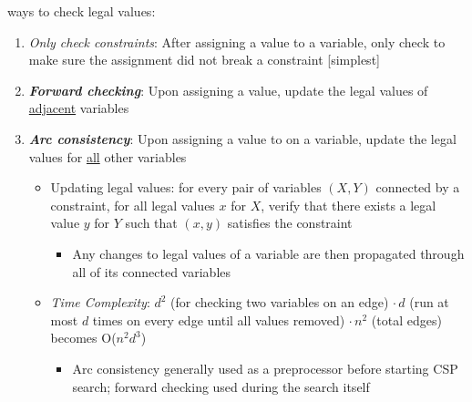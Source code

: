 \documentclass[12pt]{extarticle}
\theoremstyle{definition}
\theoremstyle{remark}
\newcommand{\pstart}[0]{\noindent}
\newcommand{\term}[1]{\noindent\textbf{\textit{#1}}}
\begin{document}
\vspace{4pt}\pstart
3 ways to check legal values: \begin{enumerate}
    \item \textit{Only check constraints}: After assigning a value to a variable, only check to make sure the assignment did not break a constraint [simplest]
    \item \term{Forward checking}: Upon assigning a value, update the legal values of \ul{adjacent} variables
    \item \term{Arc consistency}: Upon assigning a value to on a variable, update the legal values for \ul{all} other variables\begin{itemize}
        \item Updating legal values: for every pair of variables $(X,Y)$ connected by a constraint, for all legal values $x$ for $X$, verify that there exists a legal value $y$ for $Y$ such that $(x,y)$ satisfies the constraint \begin{itemize}
            \item Any changes to legal values of a variable are then propagated through all of its connected variables
        \end{itemize}
        \item \textit{Time Complexity}: $d^2$ (for checking two variables on an edge) $\cdot\,d$ (run at most $d$ times on every edge until all values removed) $\cdot\,n^2$ (total edges) becomes O($n^2d^3$) \begin{itemize}
            \item Arc consistency generally used as a preprocessor before starting CSP search; forward checking used during the search itself
        \end{itemize}
    \end{itemize}
\end{enumerate}
\end{document}
